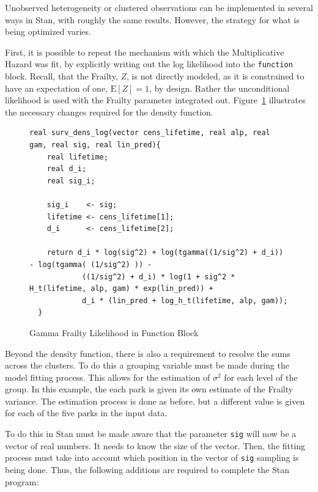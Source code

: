 Unobserved heterogeneity or clustered observations can be implemented in several ways in Stan, with roughly the same results. However, the strategy for what is being optimized varies.

First, it is possible to repeat the mechanism with which the Multiplicative Hazard was fit, by explicitly writing out the log likelihood into the \lstinline{function} block. Recall, that the Frailty, $Z$, is not directly modeled, as it is constrained to have an expectation of one, $\mathrm{E}[Z]=1$, by design. Rather the unconditional likelihood is used with the Frailty parameter integrated out. Figure~\ref{frail_funs} illustrates the necessary changes required for the density function.


\begin{figure}[htbp]
    \centering
    \begin{lstlisting}[belowskip=-2 \baselineskip]
  real surv_dens_log(vector cens_lifetime, real alp, real gam, real sig, real lin_pred){
    real lifetime;
    real d_i;
    real sig_i;

    sig_i    <- sig;
    lifetime <- cens_lifetime[1];
    d_i      <- cens_lifetime[2];
  
    return d_i * log(sig^2) + log(tgamma((1/sig^2) + d_i)) - log(tgamma( (1/sig^2) )) -
            ((1/sig^2) + d_i) * log(1 + sig^2 * H_t(lifetime, alp, gam) * exp(lin_pred)) +
            d_i * (lin_pred + log_h_t(lifetime, alp, gam));
  }
\end{lstlisting}
    \caption{Gamma Frailty Likelihood in Function Block}
    \label{frail_funs}
\end{figure}


Beyond the density function, there is also a requirement to resolve the sums across the clusters. To do this a grouping variable must be made during the model fitting process. This allows for the estimation of $\sigma^2$ for each level of the group. In this example, the each park is given its own estimate of the Frailty variance. The estimation process is done as before, but a different value is given for each of the five parks in the input data.

To do this in Stan must be made aware that the parameter \lstinline{sig} will now be a vector of real numbers. It needs to know the size of the vector. Then, the fitting process must take into account which position in the vector of \lstinline{sig} sampling is being done. Thus, the following additions are required to complete the Stan program:


